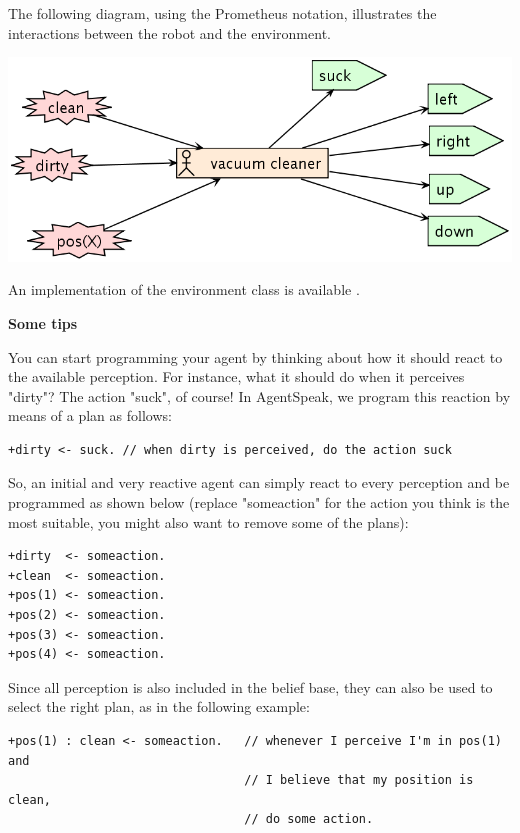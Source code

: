 \documentclass[a4paper]{article}
\begin{document}
The following diagram, using the Prometheus notation, illustrates the
interactions between the robot and the environment.
\begin{center}
  \includegraphics{figures/overview.png}
\end{center}

An implementation of the environment class is available
.


\textbf{Some tips}

You can start programming your agent by thinking about how it should
react to the available perception. For instance, what it should do
when it perceives "dirty"? The action "suck", of course! In AgentSpeak,
we program this reaction by means of a plan as follows:

\begin{verbatim}
+dirty <- suck. // when dirty is perceived, do the action suck
\end{verbatim}

So, an initial and very reactive agent can simply react to every
perception and be programmed as shown below (replace "someaction" for
the action you think is the most suitable, you might also want to
remove some of the plans):

\begin{verbatim}
+dirty  <- someaction.
+clean  <- someaction.
+pos(1) <- someaction.
+pos(2) <- someaction.
+pos(3) <- someaction.
+pos(4) <- someaction.
\end{verbatim}

Since all perception is also included in the belief base, they can
also be used to select the right plan, as in the following example:

\begin{verbatim}
+pos(1) : clean <- someaction.   // whenever I perceive I'm in pos(1) and
                                 // I believe that my position is clean, 
                                 // do some action.
\end{verbatim}
\end{document}
